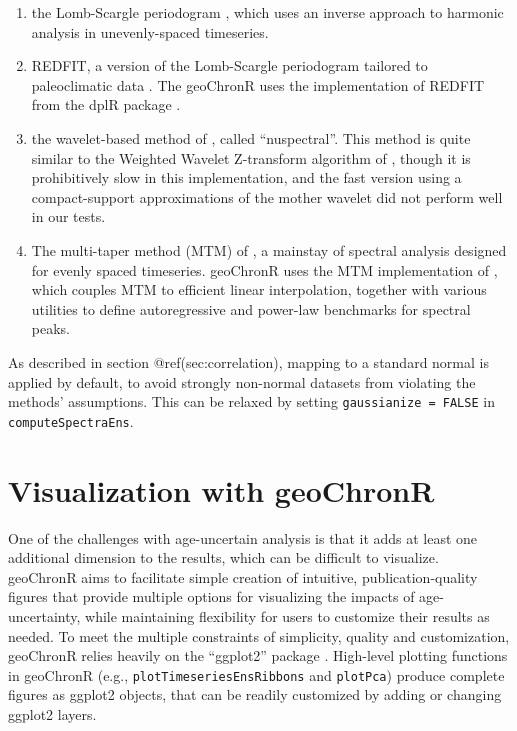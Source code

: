 \documentclass[gchron, manuscript]{copernicus}
\begin{document}
\begin{enumerate}
\def\labelenumi{\arabic{enumi}.}
\item
  the Lomb-Scargle periodogram \citep{VanderPlas_2018}, which uses an
  inverse approach to harmonic analysis in unevenly-spaced timeseries.
\item
  REDFIT, a version of the Lomb-Scargle periodogram tailored to
  paleoclimatic data \citep{schulz2002, Mudelsee_02, Mudelsee_NPG09}.
  The geoChronR uses the implementation of REDFIT from the dplR package
  \citep{Bunn2008115}.
\item
  the wavelet-based method of \citet{Mathias_JSS04}, called
  ``nuspectral''. This method is quite similar to the Weighted Wavelet
  Z-transform algorithm of \citet{Foster_AJ96}, though it is
  prohibitively slow in this implementation, and the fast version using
  a compact-support approximations of the mother wavelet did not perform
  well in our tests.
\item
  The multi-taper method (MTM) of \citet{thomson82}, a mainstay of
  spectral analysis \citep{Ghil02} designed for evenly spaced
  timeseries. geoChronR uses the MTM implementation of
  \citet{astrochron}, which couples MTM to efficient linear
  interpolation, together with various utilities to define
  autoregressive and power-law benchmarks for spectral peaks.
\end{enumerate}

As described in section @ref(sec:correlation), mapping to a standard
normal is applied by default, to avoid strongly non-normal datasets from
violating the methods' assumptions. This can be relaxed by setting
\texttt{gaussianize\ =\ FALSE} in \texttt{computeSpectraEns}.

\hypertarget{sec:visualization}{%
\section{Visualization with geoChronR}\label{sec:visualization}}

One of the challenges with age-uncertain analysis is that it adds at
least one additional dimension to the results, which can be difficult to
visualize. geoChronR aims to facilitate simple creation of intuitive,
publication-quality figures that provide multiple options for
visualizing the impacts of age-uncertainty, while maintaining
flexibility for users to customize their results as needed. To meet the
multiple constraints of simplicity, quality and customization, geoChronR
relies heavily on the ``ggplot2'' package \citep{ggplot2}. High-level
plotting functions in geoChronR (e.g., \texttt{plotTimeseriesEnsRibbons}
and \texttt{plotPca}) produce complete figures as ggplot2 objects, that
can be readily customized by adding or changing ggplot2 layers.
\end{document}
